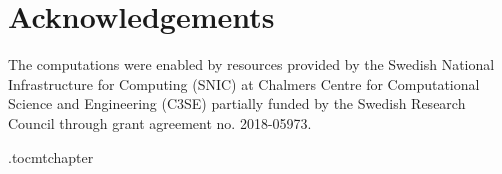 
\chapter*{Acknowledgements}
The computations were enabled by resources provided by the Swedish National Infrastructure for Computing (SNIC) at Chalmers Centre for Computational Science and Engineering (C3SE) partially funded by the Swedish Research Council through grant agreement no. 2018-05973.

\newpage
\etocdepthtag.toc{mtchapter}
\thispagestyle{plain}
\printglossary
\tableofcontents
\listoffigures
\listoftables

